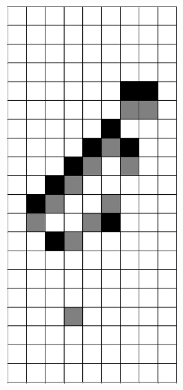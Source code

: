 \documentclass[12pt]{article}
\numberwithin{figure}{section} %
\begin{document}
\begin{figure}[H]
\begin{subfigure}{0.3\textwidth}
     		\subcaption{}
   	\end{subfigure}
        \begin{subfigure}{0.3\textwidth}
     		\centering
     		\includegraphics[angle=270,width=\linewidth]{Section4/22.5}

\end{subfigure}
\end{figure}
\end{document}

